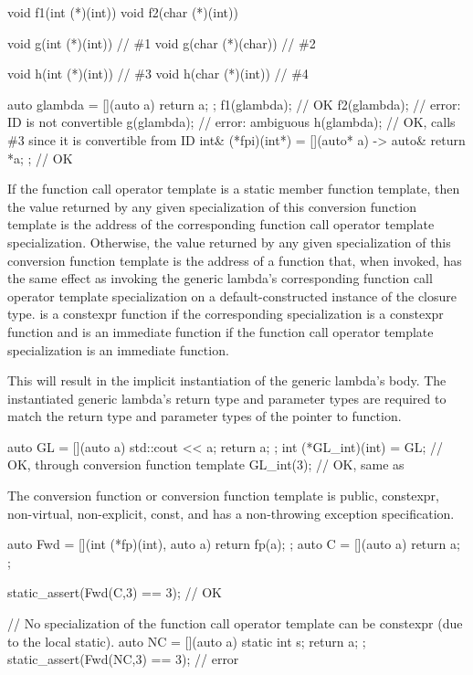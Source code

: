 \begin{example}
\begin{codeblock}
void f1(int (*)(int))   { }
void f2(char (*)(int))  { }

void g(int (*)(int))    { }     // \#1
void g(char (*)(char))  { }     // \#2

void h(int (*)(int))    { }     // \#3
void h(char (*)(int))   { }     // \#4

auto glambda = [](auto a) { return a; };
f1(glambda);                    // OK
f2(glambda);                    // error: ID is not convertible
g(glambda);                     // error: ambiguous
h(glambda);                     // OK, calls \#3 since it is convertible from ID
int& (*fpi)(int*) = [](auto* a) -> auto& { return *a; };        // OK
\end{codeblock}
\end{example}

\pnum
If the function call operator template is a static member function template,
then the value returned by
any given specialization of this conversion function template is
the address of the corresponding function call operator template specialization.
Otherwise,
the value returned by any given specialization of this conversion function
template is the address of a function  that, when invoked, has the same
effect as invoking the generic lambda's corresponding function call operator
template specialization on a default-constructed instance of the closure type.
 is a constexpr function
if the corresponding specialization is a constexpr function and
 is an immediate function
if the function call operator template specialization is an immediate function.
\begin{note}
This will result in the implicit instantiation of the generic lambda's body.
The instantiated generic lambda's return type and parameter types are required to match
the return type and parameter types of the pointer to function.
\end{note}
\begin{example}
\begin{codeblock}
auto GL = [](auto a) { std::cout << a; return a; };
int (*GL_int)(int) = GL;        // OK, through conversion function template
GL_int(3);                      // OK, same as 
\end{codeblock}
\end{example}

\pnum
The conversion function or conversion function template is public,
constexpr, non-virtual, non-explicit, const, and has a non-throwing exception
specification.
\begin{example}
\begin{codeblock}
auto Fwd = [](int (*fp)(int), auto a) { return fp(a); };
auto C = [](auto a) { return a; };

static_assert(Fwd(C,3) == 3);   // OK

// No specialization of the function call operator template can be constexpr (due to the local static).
auto NC = [](auto a) { static int s; return a; };
static_assert(Fwd(NC,3) == 3);  // error
\end{codeblock}
\end{example}

